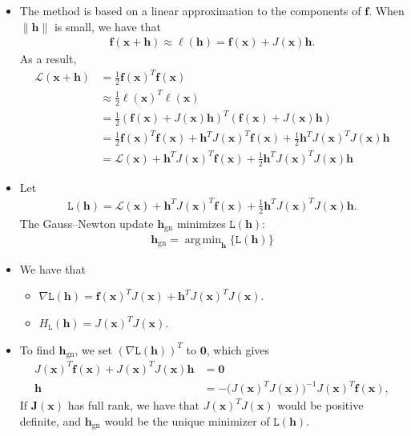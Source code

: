 \documentclass[10pt]{article}
\newcommand{\ve}[1]{\mathbf{#1}}
\newcommand{\ves}[1]{\boldsymbol{#1}}
\newcommand{\mrm}[1]{\mathrm{#1}}
\newcommand{\mcal}[1]{\mathcal{#1}}
\DeclareMathOperator*{\argmin}{arg\,min}
\begin{document}
\begin{itemize}
    \item The method is based on a linear approximation to the components of $\ve{f}$. When $\| \ve{h} \|$ is small, we have that
    \begin{align*}
        \ve{f}(\ve{x} + \ve{h}) \approx \ves{\ell}(\ve{h}) = \ve{f}(\ve{x}) + J(\ve{x})\ve{h}.
    \end{align*}
    As a result,
    \begin{align*}
        \mcal{L}(\ve{x}+\ve{h})         
        &= \frac{1}{2} \ve{f}(\ve{x})^T \ve{f}(\ve{x}) \\
        &\approx \frac{1}{2} \ves{\ell}(\ve{x})^T \ves{\ell}(\ve{x}) \\
        &= \frac{1}{2} (\ve{f}(\ve{x}) + J(\ve{x})\ve{h})^T (\ve{f}(\ve{x}) + J(\ve{x})\ve{h}) \\
        &= \frac{1}{2} \ve{f}(\ve{x})^T \ve{f}(\ve{x}) + \ve{h}^T J(\ve{x})^T \ve{f}(\ve{x}) + \frac{1}{2} \ve{h}^T J(\ve{x})^T J(\ve{x}) \ve{h} \\
        &= \mcal{L}(\ve{x}) + \ve{h}^T J(\ve{x})^T \ve{f}(\ve{x}) + \frac{1}{2} \ve{h}^T J(\ve{x})^T J(\ve{x}) \ve{h} 
    \end{align*}

    \item Let
    \begin{align*}
        \mathtt{L}(\ve{h}) = \mcal{L}(\ve{x}) + \ve{h}^T J(\ve{x})^T \ve{f}(\ve{x}) + \frac{1}{2} \ve{h}^T J(\ve{x})^T J(\ve{x}) \ve{h}.
    \end{align*}
    The Gauss--Newton update $\ve{h}_{\mrm{gn}}$ minimizes $\mathtt{L}(\ve{h})$:
    \begin{align*}
        \ve{h}_{\mrm{gn}} = \argmin_{\ve{h}} \big\{ \mathtt{L}(\ve{h}) \big\}
    \end{align*}

    \item We have that
    \begin{itemize}
        \item $\nabla \mathtt{L}(\ve{h}) = \ve{f}(\ve{x})^T J(\ve{x})  + \ve{h}^T J(\ve{x})^TJ(\ve{x})$.
        \item $H_{\mathtt{L}}(\ve{h}) = J(\ve{x})^T J(\ve{x})$.
    \end{itemize}

    \item To find $\ve{h}_{\mrm{gn}}$, we set $(\nabla \mathtt{L}(\ve{h}))^T$ to $\ve{0}$, which gives
    \begin{align*}
        J(\ve{x})^T \ve{f}(\ve{x}) + J(\ve{x})^TJ(\ve{x})\ve{h} &= \ve{0} \\
        \ve{h} &= - \big(J(\ve{x})^TJ(\ve{x})\big)^{-1} J(\ve{x})^T \ve{f}(\ve{x}),
    \end{align*}
     If $\ve{J}(\ve{x})$ has full rank, we have that $J(\ve{x})^TJ(\ve{x})$ would be positive definite, and $\ve{h}_{\mrm{gn}}$ would be the unique minimizer of $\mathtt{L}(\ve{h})$.


\end{itemize}
\end{document}
